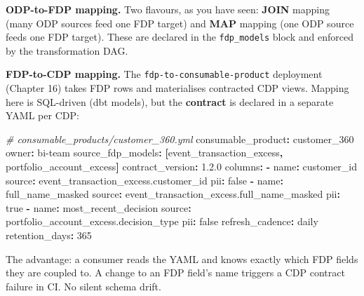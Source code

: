 \documentclass[
  11pt,
  british,
  oneside]{book}
\newenvironment{Shaded}{\begin{snugshade}}{\end{snugshade}}
\newcommand{\AttributeTok}[1]{\textcolor[rgb]{0.77,0.63,0.00}{#1}}
\newcommand{\CharTok}[1]{\textcolor[rgb]{0.31,0.60,0.02}{#1}}
\newcommand{\CommentTok}[1]{\textcolor[rgb]{0.56,0.35,0.01}{\textit{#1}}}
\newcommand{\DecValTok}[1]{\textcolor[rgb]{0.00,0.00,0.81}{#1}}
\newcommand{\FloatTok}[1]{\textcolor[rgb]{0.00,0.00,0.81}{#1}}
\newcommand{\FunctionTok}[1]{\textcolor[rgb]{0.00,0.00,0.00}{#1}}
\newcommand{\KeywordTok}[1]{\textcolor[rgb]{0.13,0.29,0.53}{\textbf{#1}}}
\begin{document}
\textbf{ODP-to-FDP mapping.} Two flavours, as you have seen:
\textbf{JOIN} mapping (many ODP sources feed one FDP target) and
\textbf{MAP} mapping (one ODP source feeds one FDP target). These are
declared in the \texttt{fdp\_models} block and enforced by the
transformation DAG.

\textbf{FDP-to-CDP mapping.} The \texttt{fdp-to-consumable-product}
deployment (Chapter 16) takes FDP rows and materialises contracted CDP
views. Mapping here is SQL-driven (dbt models), but the
\textbf{contract} is declared in a separate YAML per CDP:

\begin{Shaded}
\begin{Highlighting}[]
\CommentTok{\# consumable\_products/customer\_360.yml}
\FunctionTok{consumable\_product}\KeywordTok{:}\AttributeTok{ customer\_360}
\FunctionTok{owner}\KeywordTok{:}\AttributeTok{ bi{-}team}
\FunctionTok{source\_fdp\_models}\KeywordTok{:}\AttributeTok{ }\KeywordTok{[}\AttributeTok{event\_transaction\_excess}\KeywordTok{,}\AttributeTok{ portfolio\_account\_excess}\KeywordTok{]}
\FunctionTok{contract\_version}\KeywordTok{:}\AttributeTok{ }\FloatTok{1.2.0}
\FunctionTok{columns}\KeywordTok{:}
\AttributeTok{  }\KeywordTok{{-}}\AttributeTok{ }\FunctionTok{name}\KeywordTok{:}\AttributeTok{ customer\_id}
\AttributeTok{    }\FunctionTok{source}\KeywordTok{:}\AttributeTok{ event\_transaction\_excess.customer\_id}
\AttributeTok{    }\FunctionTok{pii}\KeywordTok{:}\AttributeTok{ }\CharTok{false}
\AttributeTok{  }\KeywordTok{{-}}\AttributeTok{ }\FunctionTok{name}\KeywordTok{:}\AttributeTok{ full\_name\_masked}
\AttributeTok{    }\FunctionTok{source}\KeywordTok{:}\AttributeTok{ event\_transaction\_excess.full\_name\_masked}
\AttributeTok{    }\FunctionTok{pii}\KeywordTok{:}\AttributeTok{ }\CharTok{true}
\AttributeTok{  }\KeywordTok{{-}}\AttributeTok{ }\FunctionTok{name}\KeywordTok{:}\AttributeTok{ most\_recent\_decision}
\AttributeTok{    }\FunctionTok{source}\KeywordTok{:}\AttributeTok{ portfolio\_account\_excess.decision\_type}
\AttributeTok{    }\FunctionTok{pii}\KeywordTok{:}\AttributeTok{ }\CharTok{false}
\FunctionTok{refresh\_cadence}\KeywordTok{:}\AttributeTok{ daily}
\FunctionTok{retention\_days}\KeywordTok{:}\AttributeTok{ }\DecValTok{365}
\end{Highlighting}
\end{Shaded}

The advantage: a consumer reads the YAML and knows exactly which FDP
fields they are coupled to. A change to an FDP field's name triggers a
CDP contract failure in CI. No silent schema drift.
\end{document}
